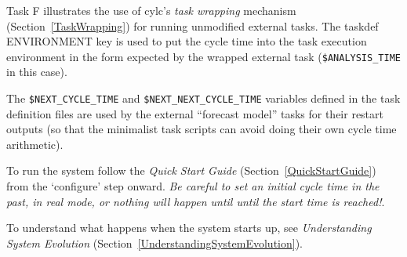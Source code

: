 Task F illustrates the use of cylc's {\em task wrapping} mechanism
(Section~\ref{TaskWrapping}) for running unmodified external tasks. 
The taskdef ENVIRONMENT key is used to put the cycle time
into the task execution environment in the form expected by the wrapped
external task (\lstinline=$ANALYSIS_TIME= in this case). 

The \lstinline=$NEXT_CYCLE_TIME= and \lstinline=$NEXT_NEXT_CYCLE_TIME=
variables defined in the task definition files are used by the external
``forecast model'' tasks for their restart outputs (so that  
the minimalist task scripts can avoid doing their own cycle time
arithmetic).

To run the system follow the {\em Quick Start Guide}
(Section~\ref{QuickStartGuide}) from the `configure' step onward. 
{\em Be careful to set an initial cycle time in the past, in real mode,
or nothing will happen until until the start time is reached!}.

To understand what happens when the system starts up, see {\em
Understanding System Evolution}
(Section~\ref{UnderstandingSystemEvolution}).
